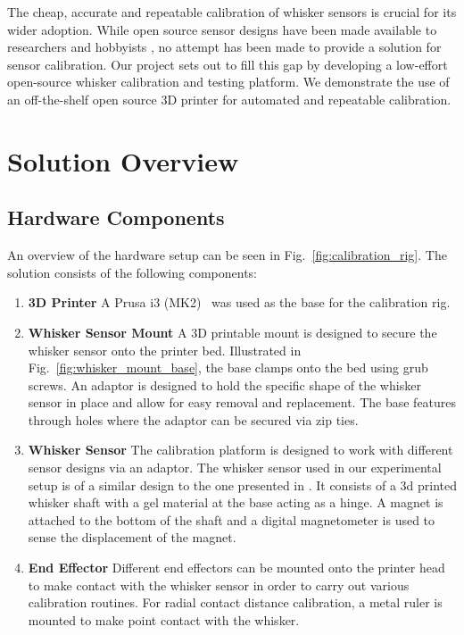 \documentclass[runningheads]{llncs}
\begin{document}
The cheap, accurate and repeatable calibration of whisker sensors is crucial for its wider adoption. While open source sensor designs have been made available to researchers and hobbyists \cite{Paparas_Ratatouille-Whiskers_Ratatouille-Whisker_Ratatouille_Whisker_2024}, no attempt has been made to provide a solution for sensor calibration. Our project sets out to fill this gap by developing a low-effort open-source whisker calibration and testing platform. We demonstrate the use of an off-the-shelf open source 3D printer for automated and repeatable calibration.

\section{Solution Overview}

\subsection{Hardware Components}

An overview of the hardware setup can be seen in Fig.~\ref{fig:calibration_rig}. The solution consists of the following components:

\begin{enumerate}
    \item \textbf{3D Printer} A Prusa i3 (MK2)~\cite{OriginalPrusaI3} was used as the base for the calibration rig.

    \item \textbf{Whisker Sensor Mount} A 3D printable mount is designed to secure the whisker sensor onto the printer bed. Illustrated in Fig.~\ref{fig:whisker_mount_base}, the base clamps onto the bed using grub screws. An adaptor is designed to hold the specific shape of the whisker sensor in place and allow for easy removal and replacement. The base features through holes where the adaptor can be secured via zip ties.

    \item \textbf{Whisker Sensor} The calibration platform is designed to work with different sensor designs via an adaptor. The whisker sensor used in our experimental setup is of a similar design to the one presented in \cite{Paparas_Ratatouille-Whiskers_Ratatouille-Whisker_Ratatouille_Whisker_2024}. It consists of a 3d printed whisker shaft with a gel material at the base acting as a hinge. A magnet is attached to the bottom of the shaft and a digital magnetometer is used to sense the displacement of the magnet.
    
    \item \textbf{End Effector} Different end effectors can be mounted onto the printer head to make contact with the whisker sensor in order to carry out various calibration routines. For radial contact distance calibration, a metal ruler is mounted to make point contact with the whisker.
\end{enumerate}
\end{document}
